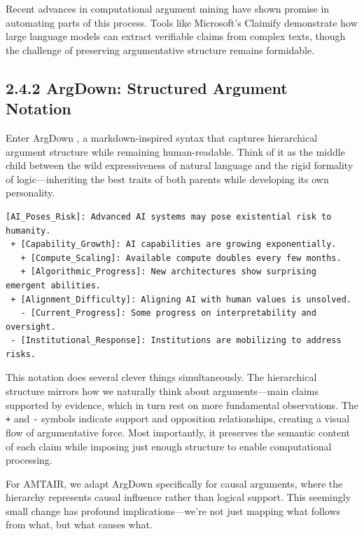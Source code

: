 \documentclass[
  11pt,
  letterpaper,
]{book}
\begin{document}
Recent advances in computational argument mining \textcite{anderson2007}
\textcite{benn2011} \textcite{khartabil2021} have shown promise in
automating parts of this process. Tools like Microsoft's Claimify
\textcite{metropolitansky2025} demonstrate how large language models can
extract verifiable claims from complex texts, though the challenge of
preserving argumentative structure remains formidable.

\subsection{2.4.2 ArgDown: Structured Argument
Notation}\label{sec-argdown-notation}

Enter ArgDown \textcite{voigt2025}, a markdown-inspired syntax that
captures hierarchical argument structure while remaining human-readable.
Think of it as the middle child between the wild expressiveness of
natural language and the rigid formality of logic---inheriting the best
traits of both parents while developing its own personality.

\begin{verbatim}
[AI_Poses_Risk]: Advanced AI systems may pose existential risk to humanity.
 + [Capability_Growth]: AI capabilities are growing exponentially.
   + [Compute_Scaling]: Available compute doubles every few months.
   + [Algorithmic_Progress]: New architectures show surprising emergent abilities.
 + [Alignment_Difficulty]: Aligning AI with human values is unsolved.
   - [Current_Progress]: Some progress on interpretability and oversight.
 - [Institutional_Response]: Institutions are mobilizing to address risks.
\end{verbatim}

This notation does several clever things simultaneously. The
hierarchical structure mirrors how we naturally think about
arguments---main claims supported by evidence, which in turn rest on
more fundamental observations. The \texttt{+} and \texttt{-} symbols
indicate support and opposition relationships, creating a visual flow of
argumentative force. Most importantly, it preserves the semantic content
of each claim while imposing just enough structure to enable
computational processing.

For AMTAIR, we adapt ArgDown specifically for causal arguments, where
the hierarchy represents causal influence rather than logical support.
This seemingly small change has profound implications---we're not just
mapping what follows from what, but what causes what.
\end{document}
